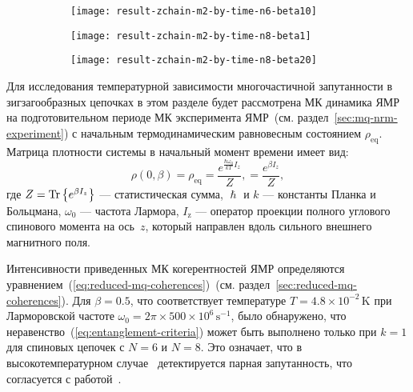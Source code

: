 \begin{figure}[H]
  \begin{subfigure}[t]{0.31\textwidth}
    \texttt{[image: result-zchain-m2-by-time-n6-beta10]}
    \caption{\protect}
    \label{fig:result-zchain-m2-by-time-n6-beta10}
  \end{subfigure}
  \hfill
  \begin{subfigure}[t]{0.32\textwidth}
    \texttt{[image: result-zchain-m2-by-time-n8-beta1]}
    \caption{\protect}
    \label{fig:result-zchain-m2-by-time-n8-beta1}
  \end{subfigure}
  \hfill
  \begin{subfigure}[t]{0.31\textwidth}
    \texttt{[image: result-zchain-m2-by-time-n8-beta20]}
    \caption{\protect}
    \label{fig:result-zchain-m2-by-time-n8-beta20}
  \end{subfigure}
  \caption{\protect}
  \label{fig:result-zchain-m2-by-time-ns-betas}
\end{figure}

Для исследования температурной зависимости многочастичной запутанности
в зигзагообразных цепочках
в этом разделе будет рассмотрена МК динамика ЯМР
на подготовительном периоде МК эксперимента ЯМР~(см. раздел~\ref{sec:mq-nrm-experiment})
с начальным термодинамическим равновесным состоянием $\rho_\mathrm{eq}$.
Матрица плотности системы в начальный момент времени имеет вид:
\begin{equation}
  \rho(0, \beta)
  = \rho_\mathrm{eq}
  = \dfrac{e^{\frac{\hbar\omega_{0}}{kT} I_z}}{Z},
  = \dfrac{e^{\beta I_z}}{Z},
\end{equation}
где $Z = \mathrm{Tr} \left\{ e^{\beta I_z} \right\}$ --- статистическая сумма,
$\hslash$ и $k$ --- константы Планка и Больцмана,
$\omega_{0}$ --- частота Лармора,
$I_\mathrm{z}$ ---  оператор проекции полного углового спинового момента  на ось~$z$,
который направлен вдоль сильного внешнего магнитного поля.

Интенсивности приведенных МК когерентностей ЯМР определяются уравнением~(\ref{eq:reduced-mq-coherences})~(см. раздел~\ref{sec:reduced-mq-coherences}).
Для $\beta=0.5$,
что соответствует температуре $T=4.8 \times 10^{-2}\,\mbox{K}$
при Ларморовской частоте $\omega_0=2\pi\times 500\times 10^6 \,\mbox{s}^{-1}$,
было обнаружено,
что неравенство~(\ref{eq:entanglement-criteria}) может быть выполнено только при $k=1$ для спиновых цепочек с $N=6$ и $N=8$.
Это означает, что в высокотемпературном случае~\cite{Doronin2019}
детектируется парная запутанность,
что согласуется с работой~\cite{Feldman2012}.

